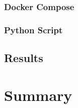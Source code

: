 \documentclass[a4paper, 12pt, oneside]{scrbook}
\begin{document}
		
		\noindent 
		
		
		\noindent 
		
		\subsection{Docker Compose}
		
		
		\subsection{Python Script}
	
	
		\section{Results}
		
		
	\chapter{Summary} %
	
	\frontmatter
	\printbibliography
\end{document}

